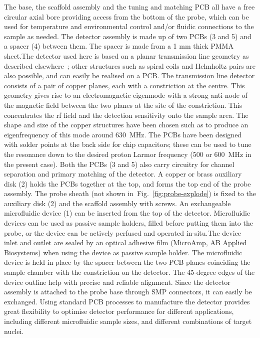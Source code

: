\documentclass[preprint,5p]{elsarticle}
\newcommand{\fig}[1]{Fig.~\ref{#1}}
\begin{document}
The base, the scaffold assembly and the tuning and matching PCB all have a free circular
axial bore providing access from the bottom of the probe, which can be used for
temperature and environmental control and/or fluidic connections to the sample as
needed. The detector assembly is made up of two PCBs (3 and 5) and a spacer (4) between them. \cbstart The spacer is made from a 1 mm thick PMMA sheet.\cbend  The detector used here is based on a planar transmission line geometry as described elsewhere~\cite{gream_2016,stripline_jan}; other structures such as spiral
coils and Helmholtz pairs are also possible, and can easily be realised on a PCB.
The transmission line detector consists of a pair of copper
planes, each with a constriction at the centre.  This geometry gives rise to an
electromagnetic eigenmode with a strong anti-node of the magnetic field between
the two planes at the site of the constriction. This concentrates the rf field
and the detection sensitivity
onto the sample area.
The shape and size of the copper structures have been chosen such as to produce
an eigenfrequency of this mode around 630~MHz. The PCBs have been designed with
solder points at the back side for chip capacitors; these can be used to tune the
resonance down to the desired proton Larmor frequency (500 or 600~MHz in the present case).
Both the PCBs (3 and 5) also carry circuitry for channel separation and primary
matching of the detector. A copper or brass auxiliary disk (2) holds the PCBs
together at the top, and forms the top end of the probe assembly.
The probe sheath (not shown in~\fig{fig:probe-explode}) is fixed to the auxiliary disk (2)
and the scaffold assembly with screws.
An exchangeable microfluidic device (1) can be inserted from the top of the detector.
Microfluidic devices can be used as passive sample holders, filled before putting them
into the probe,
or the device can be actively perfused and operated in-situ.\cbstart The device inlet and outlet are sealed by an optical adhesive film (MicroAmp, AB Applied Biosystems)
when using the device as passive sample holder.\cbend
 The microfluidic device is held in place by the spacer
between the two PCB planes coinciding the sample chamber with the constriction on the
detector.  The 45-degree edges of the device outline help with precise and reliable
alignment.
Since the detector assembly is attached to the probe base through SMP
connectors, it can easily be exchanged.
Using standard PCB processes to manufacture the detector provides great flexibility
to optimise detector performance for different applications, including different
microfluidic sample sizes, and different combinations of target nuclei.
\end{document}
